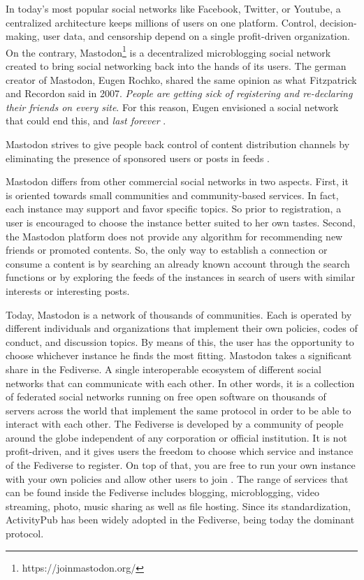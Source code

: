 In today's most popular social networks like Facebook, Twitter, or Youtube, a centralized architecture keeps millions of users on one platform. Control, decision-making, user data, and censorship depend on a single profit-driven organization. On the contrary, Mastodon\footnote{https://joinmastodon.org/} is a decentralized microblogging social network created to bring social networking back into the hands of its users. The german creator of Mastodon, Eugen Rochko, shared the same opinion as what Fitzpatrick and Recordon said in 2007\cite{fitzpatrick_recordon_2007}. \emph{People are getting sick of registering and re-declaring their friends on every site}. For this reason, Eugen envisioned a social network that could end this, and \emph{last forever} \cite{tilley_2018}. 

Mastodon strives to give people back control of content distribution channels by eliminating the presence of sponsored users or posts in feeds \cite{8845221}.

Mastodon differs from other commercial social networks in two aspects. First, it is oriented towards small communities and community-based services. In fact, each instance may support and favor specific topics. So prior to registration, a user is encouraged to choose the instance better suited to her own tastes. Second, the Mastodon platform does not provide any algorithm for recommending new friends or promoted contents. So, the only way to establish a connection or consume a content is by searching an already known account through the search functions or by exploring the feeds of the instances in search of users with similar interests or interesting posts.


Today, Mastodon is a network of thousands of communities. Each is operated by different individuals and organizations that implement their own policies, codes of conduct, and discussion topics. By means of this,  the user has the opportunity to choose whichever instance he finds the most fitting.
Mastodon takes a significant share in the Fediverse. A single interoperable ecosystem of different social networks that can communicate with each other. In other words, it is a collection of federated social networks running on free open software on thousands of servers across the world that implement the same protocol in order to be able to interact with each other. The Fediverse is developed by a community of people around the globe independent of any corporation or official institution. It is not profit-driven, and it gives users the freedom to choose which service and instance of the Fediverse to register. On top of that, you are free to run your own instance with your own policies and allow other users to join \cite{holloway_2018}. The range of services that can be found inside the Fediverse includes blogging, microblogging, video streaming, photo, music sharing as well as file hosting. Since its standardization, ActivityPub has been widely adopted in the Fediverse, being today the dominant protocol.


